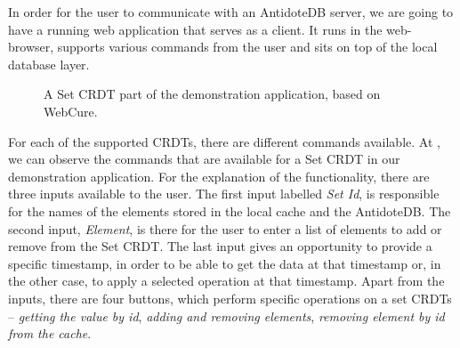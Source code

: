 In order for the user to communicate with an AntidoteDB server, we are going to have a running web application that serves as a client. It runs in the web-browser, supports various commands from the user and sits on top of the local database layer.

\begin{figure}[!htb]
    \begin{center}
    \setlength{\fboxsep}{4pt}%
    \setlength{\fboxrule}{1pt}%
    {\scriptsize}
    \caption {A Set CRDT part of the demonstration application, based on WebCure.}
    \label{fig:dev2}
\end{center}
\end{figure}
 

For each of the supported CRDTs, there are different commands available. At , we can observe the commands that are available for a Set CRDT in our demonstration application. For the explanation of the functionality, there are three inputs available to the user. The first input labelled \textit{Set Id}, is responsible for the names of the elements stored in the local cache and the AntidoteDB. The second input, \textit{Element}, is there for the user to enter a list of elements to add or remove from the Set CRDT. The last input gives an opportunity to provide a specific timestamp, in order to be able to get the data at that timestamp or, in the other case, to apply a selected operation at that timestamp. Apart from the inputs, there are four buttons, which perform specific operations on a set CRDTs -- \textit{getting the value by id}, \textit{adding and removing elements}, \textit{removing element by id from the cache}.

